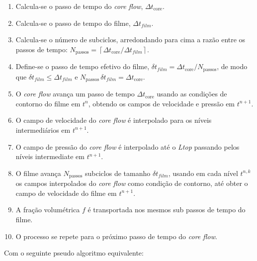 \begin{enumerate}
    \item Calcula-se o passo de tempo do \textit{core flow}, $\Delta t_\mathrm{core}$.
    \item Calcula-se o passo de tempo do filme, $\Delta t_{film}$.
    \item Calcula-se o número de subciclos, arredondando para cima a razão entre os passos de tempo: $N_\mathrm{passos} = \left\lceil \Delta t_\mathrm{core} / \Delta t_{film} \right\rceil$.
    \item Define-se o passo de tempo efetivo do filme, $\delta t_{film} = \Delta t_\mathrm{core} / N_\mathrm{passos}$, de modo que $\delta t_{film} \le \Delta t_{film}$ e $N_\mathrm{passos}\,\delta t_{film} = \Delta t_\mathrm{core}$.
    \item O \textit{core flow} avança um passo de tempo $\Delta t_\mathrm{core}$ usando as condições de contorno do filme em $t^{n}$, obtendo os campos de velocidade e pressão em $t^{n+1}$.
    \item O campo de velocidade do \textit{core flow} é interpolado para os níveis intermediários em $t^{n+1}$.
    \item O campo de pressão do \textit{core flow} é interpolado até o \textit{Ltop} passando pelos níveis intermediate em $t^{n+1}$.
    \item O filme avança $N_\mathrm{passos}$ subciclos de tamanho $\delta t_{film}$, usando em cada nível $t^{n,k}$ os campos interpolados do \textit{core flow} como condição de contorno, até obter o campo de velocidade do filme em $t^{n+1}$.
    \item A fração volumétrica $f$ é transportada nos mesmos sub passos de tempo do filme.
    \item O processo se repete para o próximo passo de tempo do \textit{core flow}.
\end{enumerate}

Com o seguinte pseudo algoritmo equivalente:

